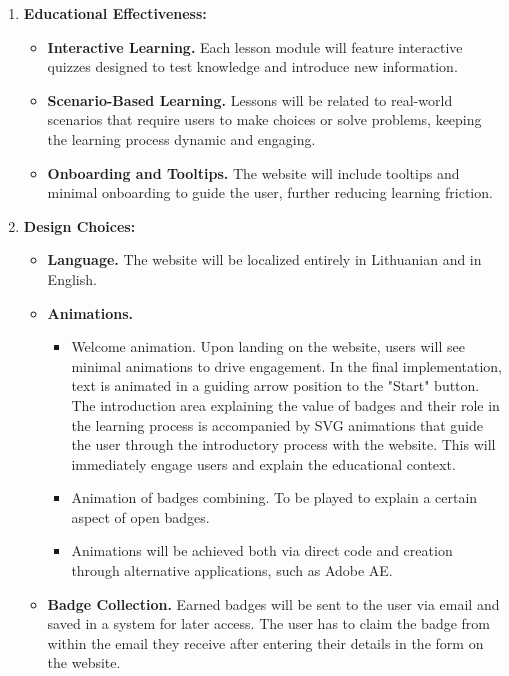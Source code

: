 \begin{enumerate}
\begin{itemize}
    \end{itemize}
    \item \textbf{Educational Effectiveness:}
    \begin{itemize}
        \item \textbf{Interactive Learning.} Each lesson module will feature interactive quizzes designed to test knowledge and introduce new information.
        \item \textbf{Scenario-Based Learning.} Lessons will be related to real-world scenarios that require users to make choices or solve problems, keeping the learning process dynamic and engaging.
        \item \textbf{Onboarding and Tooltips.} The website will include tooltips and minimal onboarding to guide the user, further reducing learning friction.
    \end{itemize}
    \item \textbf{Design Choices:}
    \begin{itemize}
        \item \textbf{Language.} The website will be localized entirely in Lithuanian and in English.
        \item \textbf{Animations.}
        \begin{itemize}
            \item Welcome animation. Upon landing on the website, users will see minimal animations to drive engagement. 
            In the final implementation, text is animated in a guiding arrow position to the "Start" button.
            The introduction area explaining the value of badges and their role in the learning process is accompanied by SVG animations that guide the user through the introductory process with the website. 
            This will immediately engage users and explain the educational context.
            \item Animation of badges combining. To be played to explain a certain aspect of open badges.
            \item Animations will be achieved both via direct code and creation through alternative applications, such as Adobe AE.
        \end{itemize}
        \item \textbf{Badge Collection.} Earned badges will be sent to the user via email and saved in a system for later access. 
        The user has to claim the badge from within the email they receive after entering their details in the form on the website.

\end{itemize}
\end{enumerate}
